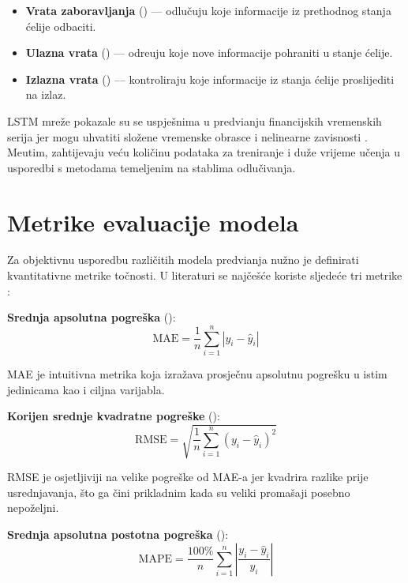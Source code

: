 \documentclass[zavrsnirad]{fer}
\begin{document}
\begin{itemize}
    \item \textbf{Vrata zaboravljanja} () --- odlu\v{c}uju koje informacije iz prethodnog stanja \'{c}elije odbaciti.
    \item \textbf{Ulazna vrata} () --- odre\dj uju koje nove informacije pohraniti u stanje \'{c}elije.
    \item \textbf{Izlazna vrata} () --- kontroliraju koje informacije iz stanja \'{c}elije proslijediti na izlaz.
\end{itemize}

LSTM mre\v{z}e pokazale su se uspje\v{s}nima u predvi\dj anju financijskih vremenskih serija jer mogu uhvatiti slo\v{z}ene vremenske obrasce i nelinearne zavisnosti \citep{fischer2018deep}. Me\dj utim, zahtijevaju ve\'{c}u koli\v{c}inu podataka za treniranje i du\v{z}e vrijeme u\v{c}enja u usporedbi s metodama temeljenim na stablima odlu\v{c}ivanja.

\section{Metrike evaluacije modela}
\label{sec:metrike}

Za objektivnu usporedbu razli\v{c}itih modela predvi\dj anja nu\v{z}no je definirati kvantitativne metrike to\v{c}nosti. U literaturi se naj\v{c}e\v{s}\'{c}e koriste sljede\'{c}e tri metrike \citep{hyndman2006another}:

\textbf{Srednja apsolutna pogre\v{s}ka} ():
\begin{equation}
    \text{MAE} = \frac{1}{n} \sum_{i=1}^{n} |y_i - \hat{y}_i|
    \label{eq:mae}
\end{equation}

MAE je intuitivna metrika koja izra\v{z}ava prosje\v{c}nu apsolutnu pogre\v{s}ku u istim jedinicama kao i ciljna varijabla.

\textbf{Korijen srednje kvadratne pogre\v{s}ke} ():
\begin{equation}
    \text{RMSE} = \sqrt{\frac{1}{n} \sum_{i=1}^{n} (y_i - \hat{y}_i)^2}
    \label{eq:rmse}
\end{equation}

RMSE je osjetljiviji na velike pogre\v{s}ke od MAE-a jer kvadrira razlike prije usrednjavanja, \v{s}to ga \v{c}ini prikladnim kada su veliki promašaji posebno nepoželjni.

\textbf{Srednja apsolutna postotna pogre\v{s}ka} ():
\begin{equation}
    \text{MAPE} = \frac{100\%}{n} \sum_{i=1}^{n} \left| \frac{y_i - \hat{y}_i}{y_i} \right|
    \label{eq:mape}
\end{equation}
\end{document}
